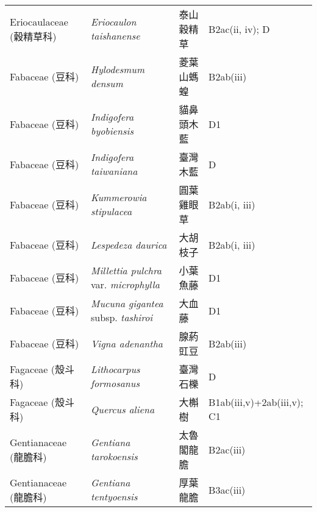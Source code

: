 \begin{longtable}{p{3cm}p{5cm}p{3cm}p{4cm}}
    Eriocaulaceae (穀精草科) & \textit{Eriocaulon taishanense}  & 泰山穀精草 & B2ac(ii, iv); D \index{Eriocaulon@\textit{Eriocaulon}!taishanense@\textit{taishanense}}  \index{泰山穀精草} \\
    Fabaceae (豆科) & \textit{Hylodesmum densum}  & 菱葉山螞蝗 & B2ab(iii) \index{Hylodesmum@\textit{Hylodesmum}!densum@\textit{densum}}  \index{菱葉山螞蝗} \\
    Fabaceae (豆科) & \textit{Indigofera byobiensis}  & 貓鼻頭木藍 & D1 \index{Indigofera@\textit{Indigofera}!byobiensis@\textit{byobiensis}}  \index{貓鼻頭木藍} \\
    Fabaceae (豆科) & \textit{Indigofera taiwaniana}  & 臺灣木藍 & D \index{Indigofera@\textit{Indigofera}!taiwaniana@\textit{taiwaniana}}  \index{臺灣木藍} \\
    Fabaceae (豆科) & \textit{Kummerowia stipulacea}  & 圓葉雞眼草 & B2ab(i, iii) \index{Kummerowia@\textit{Kummerowia}!stipulacea@\textit{stipulacea}}  \index{圓葉雞眼草} \\
    Fabaceae (豆科) & \textit{Lespedeza daurica}  & 大胡枝子 & B2ab(i, iii) \index{Lespedeza@\textit{Lespedeza}!daurica@\textit{daurica}}  \index{大胡枝子} \\
    Fabaceae (豆科) & \textit{Millettia pulchra} var. \textit{microphylla}  & 小葉魚藤 & D1 \index{Millettia@\textit{Millettia}!pulchra@\textit{pulchra}!var. microphylla@var. \textit{microphylla}}  \index{小葉魚藤} \\
    Fabaceae (豆科) & \textit{Mucuna gigantea} subsp. \textit{tashiroi}  & 大血藤 & D1 \index{Mucuna@\textit{Mucuna}!gigantea@\textit{gigantea}!subsp. tashiroi@subsp. \textit{tashiroi}}  \index{大血藤} \\
    Fabaceae (豆科) & \textit{Vigna adenantha}  & 腺葯豇豆 & B2ab(iii) \index{Vigna@\textit{Vigna}!adenantha@\textit{adenantha}}  \index{腺葯豇豆} \\
    Fagaceae (殼斗科) & \textit{Lithocarpus formosanus}  & 臺灣石櫟 & D \index{Lithocarpus@\textit{Lithocarpus}!formosanus@\textit{formosanus}}  \index{臺灣石櫟} \\
    Fagaceae (殼斗科) & \textit{Quercus aliena}  & 大槲樹 & B1ab(iii,v)+2ab(iii,v); C1 \index{Quercus@\textit{Quercus}!aliena@\textit{aliena}}  \index{大槲樹} \\
    Gentianaceae (龍膽科) & \textit{Gentiana tarokoensis}  & 太魯閣龍膽 & B2ac(iii) \index{Gentiana@\textit{Gentiana}!tarokoensis@\textit{tarokoensis}}  \index{太魯閣龍膽} \\
    Gentianaceae (龍膽科) & \textit{Gentiana tentyoensis}  & 厚葉龍膽 & B3ac(iii) \index{Gentiana@\textit{Gentiana}!tentyoensis@\textit{tentyoensis}}  \index{厚葉龍膽} \\

\end{longtable}

